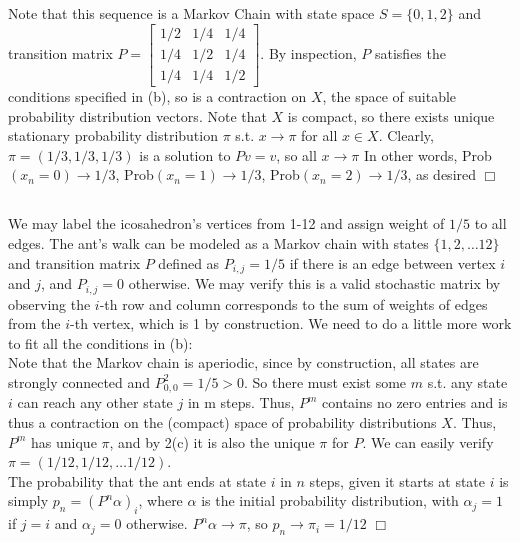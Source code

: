 \documentclass{article}
\begin{document}
\subsection{}
Note that this sequence is a Markov Chain with state space $S = \{0,1,2\}$ and transition matrix $P = \begin{bmatrix}
  1/2 & 1/4 & 1/4\\ 
  1/4 & 1/2 & 1/4\\
  1/4 & 1/4 & 1/2
\end{bmatrix} $. By inspection, $P$ satisfies the conditions specified in (b), so is a contraction on $X$, the space of suitable probability distribution vectors. Note that $X$ is compact, so there exists unique stationary probability distribution $\pi$ s.t. $x \rightarrow \pi$ for all $x \in X$. Clearly, $\pi = (1/3,1/3,1/3)$ is a solution to $Pv = v$, so all $x\rightarrow \pi$ In other words, Prob$(x_n=0) \rightarrow 1/3$, Prob$(x_n=1) \rightarrow 1/3$, Prob$(x_n=2) \rightarrow 1/3$, as desired $\Box$

\subsection{}
We may label the icosahedron's vertices from 1-12 and assign weight of $1/5$ to all edges. The ant's walk can be modeled as a Markov chain with states $\{1,2,\dots12\}$ and transition matrix $P$ defined as $P_{i,j} = 1/5$ if there is an edge between vertex $i$ and $j$, and $P_{i,j} = 0$ otherwise.
We may verify this is a valid stochastic matrix by observing the $i$-th row and column corresponds to the sum of weights of edges from the $i$-th vertex, which is 1 by construction. We need to do a little more work to fit all the conditions in (b):\\
Note that the Markov chain is aperiodic, since by construction, all states are strongly connected and $P^2_{0,0} = 1/5 > 0$. So there must exist some $m$ s.t. any state $i$ can reach any other state $j$ in m steps. Thus, $P^m$ contains no zero entries and is thus a contraction on the (compact) space of probability distributions $X$. Thus, $P^m$ has unique $\pi$, and by 2(c) it is also the unique $\pi$ for $P$. We can easily verify $\pi = (1/12,1/12,\dots 1/12)$.\\
The probability that the ant ends at state $i$ in $n$ steps, given it starts at state $i$ is simply $p_n = (P^n\alpha)_i$, where $\alpha$ is the initial probability distribution, with $\alpha_j = 1$ if $j=i$ and $\alpha_j = 0$ otherwise. $P^n\alpha \rightarrow \pi$, so $p_n \rightarrow \pi_i = 1/12$ $\Box$
\end{document}
